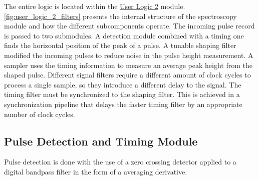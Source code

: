\documentclass[a4paper,12pt,table]{article}
\begin{document}
	The entire logic is located within the \hyperref[ssec:data_flow_in_user_logic_2]{User Logic 2} module. 
	\autoref{fig:user_logic_2_filters} presents the internal structure of the spectroscopy module and how 
	the different subcomponents operate. The incoming pulse record is passed to two submodules.
	A detection module combined with a timing one finds the horizontal position of the peak of a pulse.
	A tunable shaping filter modified the incoming pulses to reduce noise in the pulse height measurement.
	A sampler uses the timing information to measure an average peak height from the shaped pulse.
	Different signal filters require a different amount of clock cycles to process a single sample, 
	so they introduce a different delay to the signal. The timing filter must be synchronized to the shaping filter.
	This is achieved in a synchronization pipeline that delays the faster timing filter 
	by an appropriate number of clock cycles.
	\newpage
	\subsection{Pulse Detection and Timing Module}\label{ssec:pulse_detection_module}
		Pulse detection is done with the use of a zero crossing detector 
		applied to a digital bandpass filter in the form of a averaging derivative.	
		
\end{document}
